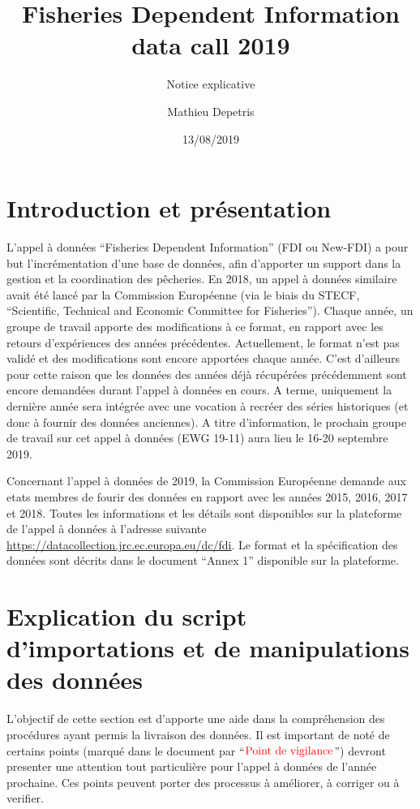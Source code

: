 \documentclass[]{article}
\title{Fisheries Dependent Information data call 2019}
\subtitle{Notice explicative}
\author{Mathieu Depetris}
\date{13/08/2019}
\begin{document}
\maketitle

{
\setcounter{tocdepth}{3}
\tableofcontents
}
\hypertarget{introduction-et-presentation}{%
\section{Introduction et
présentation}\label{introduction-et-presentation}}

L'appel à données ``Fisheries Dependent Information'' (FDI ou New-FDI) a
pour but l'incrémentation d'une base de données, afin d'apporter un
support dans la gestion et la coordination des pêcheries. En 2018, un
appel à données similaire avait été lancé par la Commission Européenne
(via le biais du STECF, ``Scientific, Technical and Economic Committee
for Fisheries''). Chaque année, un groupe de travail apporte des
modifications à ce format, en rapport avec les retours d'expériences des
années précédentes. Actuellement, le format n'est pas validé et des
modifications sont encore apportées chaque année. C'est d'ailleurs pour
cette raison que les données des années déjà récupérées précédemment
sont encore demandées durant l'appel à données en cours. A terme,
uniquement la dernière année sera intégrée avec une vocation à recréer
des séries historiques (et donc à fournir des données anciennes). A
titre d'information, le prochain groupe de travail sur cet appel à
données (EWG 19-11) aura lieu le 16-20 septembre 2019.

Concernant l'appel à données de 2019, la Commission Européenne demande
aux etats membres de fourir des données en rapport avec les années 2015,
2016, 2017 et 2018. Toutes les informations et les détails sont
disponibles sur la plateforme de l'appel à données à l'adresse suivante
\url{https://datacollection.jrc.ec.europa.eu/dc/fdi}. Le format et la
spécification des données sont décrits dans le document ``Annex 1''
disponible sur la plateforme.

\hypertarget{explication-du-script-dimportations-et-de-manipulations-des-donnees}{%
\section{Explication du script d'importations et de manipulations des
données}\label{explication-du-script-dimportations-et-de-manipulations-des-donnees}}

L'objectif de cette section est d'apporte une aide dans la compréhension
des procédures ayant permis la livraison des données. Il est important
de noté de certains points (marqué dans le document par
``\textbf{\(\color{red}{\text{Point de vigilance}}\)}'') devront
presenter une attention tout particulière pour l'appel à données de
l'année prochaine. Ces points peuvent porter des processus à améliorer,
à corriger ou à verifier.
\end{document}
